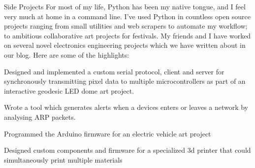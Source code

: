 \begin{cventries}

    \cventrysimple
        {Side Projects}
        {
            For most of my life, Python has been my native tongue, and I feel very much at home in a command line. I've used Python in countless open source projects ranging from small utilities and web scrapers to automate my workflow; to ambitious collaborative art projects for festivals. My friends and I have worked on several novel electronics engineering projects which we have written about in our blog. Here are some of the highlights:
        }
        {
            \begin{cvitems}
                \item { \acvSubItemSep Designed and implemented a custom serial protocol, client and server for synchronously transmitting pixel data to multiple microcontrollers as part of an interactive geodesic LED dome art project.}
                \item { \acvSubItemSep Wrote a tool which generates alerts when a devices enters or leaves a network by analysing ARP packets.}
                \item { \acvSubItemSep Programmed the Arduino firmware for an electric vehicle art project}
                \item { \acvSubItemSep Designed custom components and firmware for a specialized 3d printer that could simultaneously print multiple materials}
            \end{cvitems}
        }



\end{cventries}
